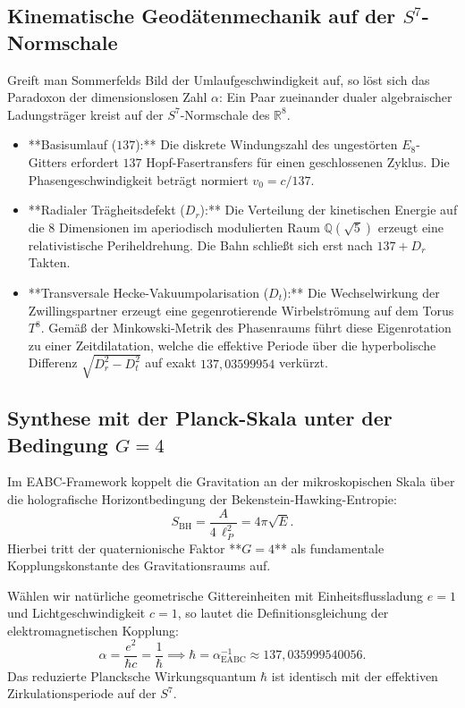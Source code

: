 \documentclass[11pt,a4paper]{article}
\begin{document}
\subsection{Kinematische Geodätenmechanik auf der $S^7$-Normschale}
Greift man Sommerfelds Bild der Umlaufgeschwindigkeit auf, so löst sich das Paradoxon der dimensionslosen Zahl $\alpha$:
Ein Paar zueinander dualer algebraischer Ladungsträger kreist auf der $S^7$-Normschale des $\mathbb{R}^8$. 
\begin{itemize}
    \item **Basisumlauf ($137$):** Die diskrete Windungszahl des ungestörten $E_8$-Gitters erfordert $137$ Hopf-Fasertransfers für einen geschlossenen Zyklus. Die Phasengeschwindigkeit beträgt normiert $v_0 = c / 137$.
    \item **Radialer Trägheitsdefekt ($D_r$):** Die Verteilung der kinetischen Energie auf die 8 Dimensionen im aperiodisch modulierten Raum $\mathbb{Q}(\sqrt{5})$ erzeugt eine relativistische Periheldrehung. Die Bahn schließt sich erst nach $137 + D_r$ Takten.
    \item **Transversale Hecke-Vakuumpolarisation ($D_t$):** Die Wechselwirkung der Zwillingspartner erzeugt eine gegenrotierende Wirbelströmung auf dem Torus $T^8$. Gemäß der Minkowski-Metrik des Phasenraums führt diese Eigenrotation zu einer Zeitdilatation, welche die effektive Periode über die hyperbolische Differenz $\sqrt{D_r^2 - D_t^2}$ auf exakt $137{,}03599954$ verkürzt.
\end{itemize}

\subsection{Synthese mit der Planck-Skala unter der Bedingung $G = 4$}
Im EABC-Framework koppelt die Gravitation an der mikroskopischen Skala über die holografische Horizontbedingung der Bekenstein-Hawking-Entropie:
\begin{equation}
S_{\mathrm{BH}} = \frac{A}{4\,\ell_P^2} = 4\pi \sqrt{E}.
\end{equation}
Hierbei tritt der quaternionische Faktor **$G = 4$** als fundamentale Kopplungskonstante des Gravitationsraums auf. 

Wählen wir natürliche geometrische Gittereinheiten mit Einheitsflussladung $e = 1$ und Lichtgeschwindigkeit $c = 1$, so lautet die Definitionsgleichung der elektromagnetischen Kopplung:
\begin{equation}
\alpha = \frac{e^2}{\hbar c} = \frac{1}{\hbar} \implies \hbar = \alpha^{-1}_{\mathrm{EABC}} \approx 137{,}035999540056.
\end{equation}
Das reduzierte Plancksche Wirkungsquantum $\hbar$ ist identisch mit der effektiven Zirkulationsperiode auf der $S^7$.
\end{document}
